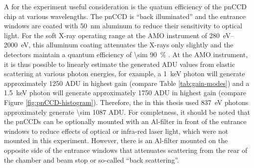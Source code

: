 A for the experiment useful consideration is the quatum efficiency of the pnCCD chip at various wavelengths. The pnCCD is ``back illuminated'' and the entrance windows are coated with \SI{50}{\nano\meter} aluminum to reduce their sensitivity to optical light. For the soft X-ray operating range at the AMO instrument of \SIrange{280}{2000}{\electronvolt}, this alluminum coating attenuates the X-rays only slightly and the detectors maintain a quantum efficiency of \SI{\sim 90}{\percent} \cite{Strueder-2010-NIMPA}. At the AMO instrument, it is thus possible to linearly estimate the generated ADU values from elastic scattering at various photon energies, for example, a \SI{1}{\kilo\electronvolt} photon will generate approximately \num{1250} ADU in highest gain (compare Table \ref{tab:gain-modes}) and a \SI{1.5}{\kilo\electronvolt} photon will generate approximately \num{1750} ADU in highest gain (compare Figure \ref{fig:pnCCD-histogram}). Therefore, the in this thesis used \SI{837}{\electronvolt} photons approximately generate \num{\sim 1087} ADU. For completness, it should be noted that the pnCCDs can be optionally mounted with an Al-filter in front of the entrance windows to reduce effects of optical or infra-red laser light, which were not mounted in this experiment. However, there is an Al-filter mounted on the opposite side of the entrance windows that attenuates scattering from the rear of the chamber and beam stop or so-called ``back scattering''.
%
%
%
%
%
